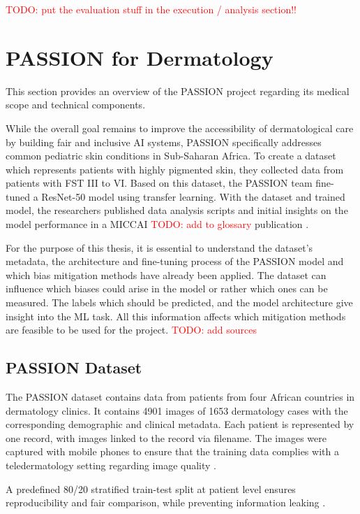 \documentclass[12pt, a4paper, oneside]{book}   	%
\renewcommand{\todo}[1]{\textcolor{red}{TODO: #1}}
\begin{document}
		
		\todo{put the evaluation stuff in the execution / analysis section!!}
		
		
		\section{PASSION for Dermatology}
			This section provides an overview of the PASSION project regarding its medical scope and technical components.
			
			While the overall goal remains to improve the accessibility of dermatological care by building fair and inclusive AI systems, PASSION specifically addresses common \gls{pediatric} skin conditions in Sub-Saharan Africa. To create a dataset which represents patients with highly pigmented skin, they collected data from patients with \gls{FST} III to VI. Based on this dataset, the PASSION team fine-tuned a ResNet-50 model using transfer learning. With the dataset and trained model, the researchers published data analysis scripts and initial insights on the model performance in a MICCAI \todo{add to glossary} publication \autocite{Gottfrois2024}.
			
			For the purpose of this thesis, it is essential to understand the dataset's metadata, the architecture and fine-tuning process of the PASSION model and which bias mitigation methods have already been applied. The dataset can influence which biases could arise in the model or rather which ones can be measured. The labels which should be predicted, and the model architecture give insight into the \gls{ML} task. All this information affects which mitigation methods are feasible to be used for the project. \todo{add sources}
			
			\subsection{PASSION Dataset}
				The PASSION dataset contains data from patients from four African countries in dermatology clinics. It contains 4901 images of 1653 dermatology cases with the corresponding demographic and clinical metadata. Each patient is represented by one record, with images linked to the record via filename. The images were captured with mobile phones to ensure that the training data complies with a \gls{teledermatology} setting regarding image quality \autocite{Gottfrois2024}.
				
			    A predefined 80/20 stratified train-test split at patient level ensures reproducibility and fair comparison, while preventing information leaking \autocite{Gottfrois2024}.
			    
\end{document}
